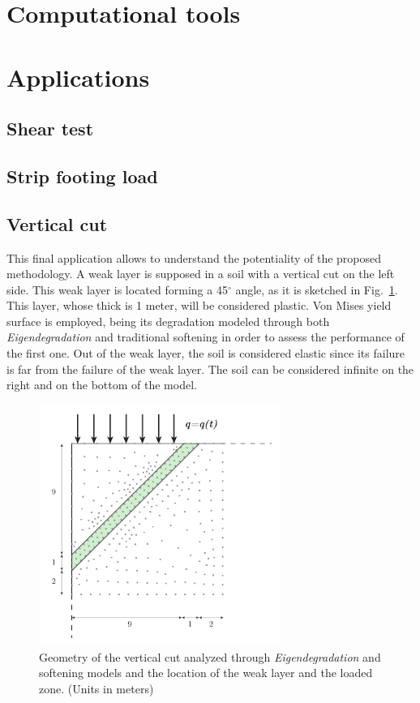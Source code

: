 \documentclass[applsci,journal,article,submit,moreauthors,pdftex]{Definitions/mdpi}
\begin{document}
\section{Computational tools}

\section{Applications}
\subsection{Shear test}
\subsection{Strip footing load}
\subsection{Vertical cut}
This final application allows to understand the potentiality of the proposed methodology. A weak layer is supposed in a soil with a vertical cut on the left side. This weak layer is located forming a 45$^\circ$ angle, as it is sketched in Fig.~\ref{fig_VC1}. This layer, whose thick is 1 meter, will be considered plastic. Von Mises yield surface is employed, being its degradation modeled through both \emph{Eigendegradation} and traditional softening in order to assess the performance of the first one. Out of the weak layer, the soil is considered elastic since its failure is far from the failure of the weak layer. The soil can be considered infinite on the right and on the bottom of the model.

\begin{figure}
\includegraphics[width=0.7\textwidth]{Figs/geo_VC.pdf}
\caption{Geometry of the vertical cut analyzed through \emph{Eigendegradation} and softening models and the location of the weak layer and the loaded zone. (Units in meters)}
\label{fig_VC1}
\end{figure}
\end{document}
